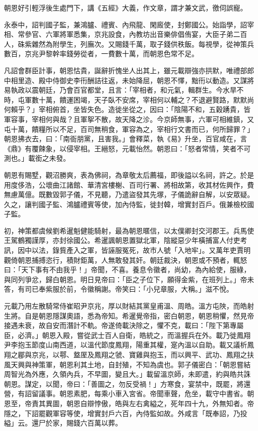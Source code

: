 \begin{pinyinscope}
 朝恩好引輕浮後生處門下，講《五經》大義，作文章，謂才兼文武，徼伺誤寵。



 永泰中，詔判國子監，兼鴻臚、禮賓、內飛龍、閑廄使，封鄭國公。始詣學，詔宰相、常參官、六軍將軍悉集，京兆設食，內教坊出音樂俳倡侑宴，大臣子弟二百人，硃紫雜然為附學生，列廡次。又賜錢千萬，取子錢供秩飯。每視學，從神策兵數百，京兆尹黎幹率錢勞從者，一費數十萬，而朝恩色常不足。



 凡詔會群臣計事，朝恩怙貴，誕辭折愧坐人出其上，雖元載辯強亦拱默，唯禮部郎中相里造、殿中侍御史李衎酬詰往返，未始降屈，朝恩不懌，黜衎以動造。又謀將易執政以震朝廷，乃會百官都堂，且言：「宰相者，和元氣，輯群生。今水旱不時，屯軍數十萬，饋運困竭，天子臥不安席，宰相何以輔之？不退避賢路，默默尚何賴乎？」宰相俯首，坐皆失色。造徙坐從之，因曰：「陰陽不和，五穀踴貴，皆軍容事，宰相何與哉？且軍挐不散，故天降之沴。今京師無事，六軍可相維鎮，又屯十萬，饋糧所以不足，百司無稍食，軍容為之，宰相行文書而已，何所歸罪？」朝恩拂衣去，曰：「南衙朋黨，且害我。」會釋菜，執《易》升坐，百官咸在，言《鼎》有覆餗象，以侵宰相。王縉怒，元載怡然。朝恩曰：「怒者常情，笑者不可測也。」載銜之未發。



 朝恩有賜墅，觀沼勝爽，表為佛祠，為章敬太后薦福，即後謚以名祠，許之。於是用度侈浩，公壞曲江諸館、華清宮樓榭、百司行署、將相故第，收其材佐興作，費無慮萬億。既數毀郭子儀，不見聽，乃遣盜發其先塚，子儀詭辭自解，以安眾疑。久之，讓判國子監、鴻臚禮賓等使，加內侍監，徙封韓，增實封百戶。俄兼檢校國子監。



 初，神策都虞候劉希暹魁健能騎射，最為朝恩暱信，以太僕卿封交河郡王。兵馬使王駕鶴獨謹厚，亦封徐國公。希暹諷朝恩置獄北軍，陰縱惡少年橫捕富人付吏考訊，因中以法，錄貲產入之軍，皆誣服冤死，故市人號「入地牢」。又萬年吏賈明觀倚朝恩捕搏恣行，積財鉅萬，人無敢發其奸。朝廷裁決，朝恩或不預者，輒怒曰：「天下事有不由我乎！」帝聞，不喜。養息令徽者，尚幼，為內給使，服綠，與同列爭忿，歸白朝恩。明日見帝曰：「臣之子位下，願得金紫，在班列上。」帝未答，有司已奉紫服於前，令徽稱謝。帝笑曰：「小兒章服，大稱。」滋不悅。



 元載乃用左散騎常侍崔昭尹京兆，厚以財結其黨皇甫溫、周皓。溫方屯陜，而皓射生將。自是朝恩隱謀奧語，悉為帝知。希暹覺帝指，密白朝恩，朝恩稍懼，然見帝接遇未衰，故自安而潛計不軌。帝遂倚載決除之，懼不克，載曰：「陛下第專屬臣，必濟。」朝恩入殿，嘗從武士百人自衛，皓統之，而溫握兵在外。載乃徙鳳翔尹李抱玉節度山南西道，以溫代節度鳳翔，陽重其權，寔內溫以自助。載又議析鳳翔之郿與京兆，以鄠、盩厔及鳳翔之虢、寶雞與抱玉，而以興平、武功、鳳翔之扶風天興與神策軍，朝恩利其土地，自封殖，不知為虞也。郭子儀密白：「朝恩嘗結周智光為外應，久領內兵，不早圖，變且大。」載留溫京師，未即遣，約與皓共誅朝恩。謀定，以聞，帝曰：「善圖之，勿反受禍！」方寒食，宴禁中，既罷，將還營，有詔留議事。朝恩素肥，每乘小車入宮省。帝聞車聲，危坐，載守中書省。朝恩至，帝責其異圖，朝恩自辯悖傲，皓與左右禽縊之，死年四十九，外無知者。帝隱之，下詔罷觀軍容等使，增實封戶六百，內侍監如故。外咸言「既奉詔，乃投縊」云。還尸於家，賜錢六百萬以葬。




\end{pinyinscope}
